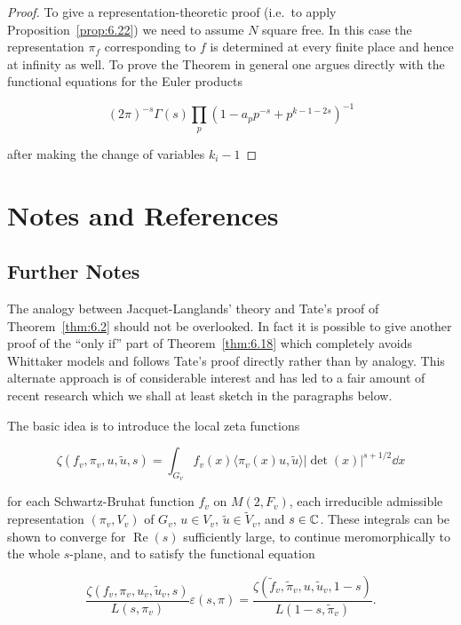 \begin{proof}

To give a representation-theoretic proof (i.e.\ to apply Proposition~\ref{prop:6.22}) we need to assume $N$ square free. In this case the representation $\pi_f$ corresponding to $f$ is determined at every finite place and hence at infinity as well. To prove the Theorem in general one argues directly with the functional equations for the Euler products

\[
(2\pi)^{-s}\Gamma(s) \prod_p \left(1 - a_p p^{-s} + p^{k-1-2s}\right)^{-1}
\]

after making the change of variables $k_i - 1$

\end{proof}

\section*{Notes and References}


\subsection*{Further Notes}

The analogy between Jacquet-Langlands' theory and Tate's proof of Theorem~\ref{thm:6.2} should not be overlooked. In fact it is possible to give another proof of the ``only if'' part of Theorem~\ref{thm:6.18} which completely avoids Whittaker models and follows Tate's proof directly rather than by analogy. This alternate approach is of considerable interest and has led to a fair amount of recent research which we shall at least sketch in the paragraphs below.

The basic idea is to introduce the local zeta functions

\[
\zeta(f_v, \pi_v, u, \tilde{u}, s) = \int_{G_v} f_v(x) \langle \pi_v(x)u, \tilde{u} \rangle |\det(x)|^{s + 1/2} \dd x
\]

for each Schwartz-Bruhat function $f_v$ on $M(2, F_v)$, each irreducible admissible representation $(\pi_v, V_v)$ of $G_v$, $u \in V_v$, $\tilde{u} \in \tilde{V}_v$, and $s \in \mathbb{C}$. These integrals can be shown to converge for $\operatorname{Re}(s)$ sufficiently large, to continue meromorphically to the whole $s$-plane, and to satisfy the functional equation

\begin{equation}
\frac{\zeta(f_v, \pi_v, u_v, \tilde{u}_v, s)}{L(s, \pi_v)} \varepsilon(s, \pi) = \frac{\zeta(\tilde{f}_v, \tilde{\pi}_v, u, \tilde{u}_v, 1 - s)}{L(1 - s, \tilde{\pi}_v)}.\tag{*}
\end{equation}

